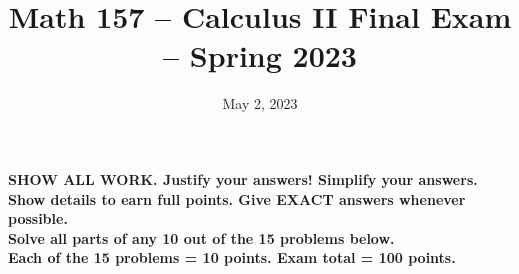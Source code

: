 \documentclass[10pt]{article}
\title{Math 157 -- Calculus II Final Exam -- Spring 2023}
\date{May 2, 2023}	%
\begin{document}
\maketitle

\begin{center}
\noindent \textbf{SHOW ALL WORK. Justify your answers! Simplify your answers.\\Show details to earn full points. Give EXACT answers whenever possible.\\ Solve all parts of any 10 out of the 15 problems below.\\Each of the 15 problems = 10 points. Exam total = 100 points.}
\end{center}
\end{document}
